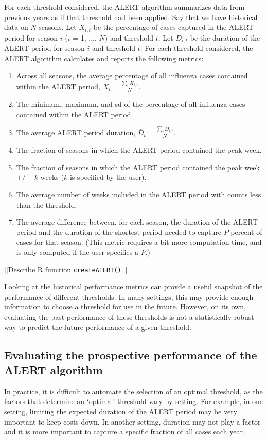 \documentclass[11pt]{article}\usepackage[]{graphicx}\usepackage[]{color}
\begin{document}
For each threshold considered, the ALERT algorithm summarizes data from previous years as if that threshold had been applied. Say that we have historical data on $N$ seasons. Let $X_{i,t}$ be the percentage of cases captured in the ALERT period for season $i$ ($i$ = 1, ..., $N$) and threshold $t$. Let $D_{i,t}$ be the duration of the ALERT period for season $i$ and threshold $t$. For each threshold considered, the ALERT algorithm calculates and reports the following metrics:
\begin{enumerate}
        \item Across all seasons, the average percentage of all influenza cases contained within the ALERT period, $\bar X_t = \frac{\sum_i X_{i,t}}{N}$. 
        \item The minimum, maximum, and sd of the percentage of all influenza cases contained within the ALERT period.
        \item The average ALERT period duration, $\bar D_t = \frac{\sum_i D_{i,t}}{N}$.
        \item The fraction of seasons in which the ALERT period contained the peak week.
        \item The fraction of seasons in which the ALERT period contained the peak week $+/- k$ weeks ($k$ is specified by the user).
        \item The average number of weeks included in the ALERT period with counts less than the threshold.
        \item The average difference between, for each season, the duration of the ALERT period and the duration of the shortest period needed to capture $P$ percent of cases for that season. (This metric requires a bit more computation time, and is only computed if the user specifies a $P$.)  
\end{enumerate}

[[Describe R function {\tt createALERT()}.]]

Looking at the historical performance metrics can provde a useful snapshot of the performance of different thresholds. In many settings, this may provide enough information to choose a threshold for use in the future. However, on its own, evaluating the past performance of these thresholds is not a statistically robust way to predict the future performance of a given threshold. 

\subsection*{Evaluating the prospective performance of the ALERT algorithm}
In practice, it is difficult to automate the selection of an optimal threshold, as the factors that determine an `optimal' threshold vary by setting. For example, in one setting, limiting the expected duration of the ALERT period may be very important to keep costs down. In another setting, duration may not play a factor and it is more important to capture a specific fraction of all cases each year.
\end{document}
